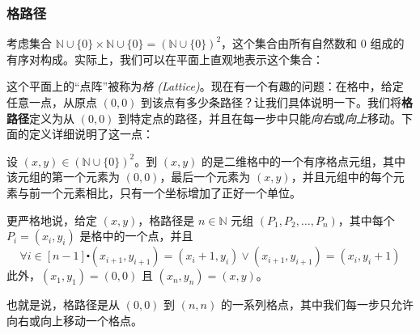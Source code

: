 \subsubsection*{格路径}

考虑集合 $\mathbb{N} \cup \{0\} \times \mathbb{N} \cup \{0\} = (\mathbb{N} \cup \{0\})^2$，这个集合由所有自然数和 $0$ 组成的有序对构成。实际上，我们可以在平面上直观地表示这个集合：
\begin{center}
\end{center}
这个平面上的``点阵''被称为\emph{格 (Lattice)}。现在有一个有趣的问题：在格中，给定任意一点，从原点 $(0, 0)$ 到该点有多少条路径？让我们具体说明一下。我们将\textbf{格路径}定义为从 $(0, 0)$ 到特定点的路径，并且在每一步中只能\emph{向右}或\emph{向上}移动。下面的定义详细说明了这一点：

\begin{definition}
    设 $(x,y) \in (\mathbb{N} \cup \{0\})^2$。到 $(x, y)$ 的是二维格中的一个有序格点元组，其中该元组的第一个元素为 $(0, 0)$，最后一个元素为 $(x, y)$，并且元组中的每个元素与前一个元素相比，只有一个坐标增加了正好一个单位。

    更严格地说，给定 $(x, y)$，格路径是 $n \in \mathbb{N}$ 元组 $(P_1, P_2, \dots, P_n)$，其中每个 $P_i = (x_i, y_i)$ 是格中的一个点，并且
    \[\forall i \in [n - 1] \centerdot (x_{i+1}, y_{i+1}) = (x_i + 1, y_i) \lor (x_{i+1}, y_{i+1}) = (x_i, y_i + 1)\]
    此外，$(x_1, y_1) = (0, 0)$ 且 $(x_n, y_n) = (x, y)$。

    也就是说，格路径是从 $(0, 0)$ 到 $(n, n)$ 的一系列格点，其中我们每一步只允许向右或向上移动一个格点。
\end{definition}

